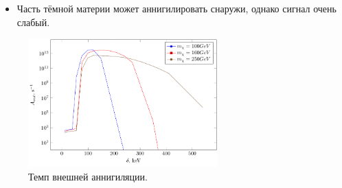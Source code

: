 \begin{itemize}
	\item Часть тёмной материи может аннигилировать снаружи, однако сигнал очень слабый.
\end{itemize}

\begin{figure}[!h]
	\centering
	\includegraphics[width=0.65\textwidth]{images/Aout.png}
	\caption{Темп внешней аннигиляции.}
\end{figure}